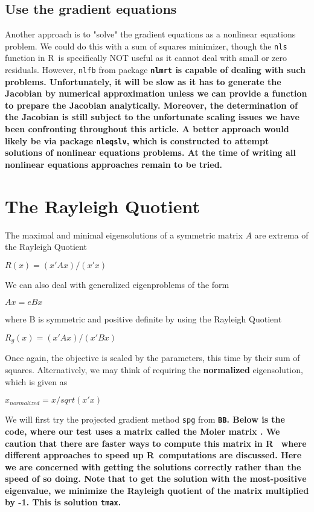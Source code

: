 \documentclass[11pt]{article}\usepackage[]{graphicx}\usepackage[]{color}
\newcommand{\B}[1]{{\bf #1 \rm}}
\newcommand{\R}{{\sf R}}
\newcommand{\code}[1]{{\tt#1}}
\newcommand{\pkg}[1]{\bf{\tt#1}\rm }
\begin{document}
\subsection{Use the gradient equations}

Another approach is to "solve" the gradient equations as a nonlinear equations
problem. We could do this with 
a sum of squares minimizer, though the \code{nls} function in \R\ is 
specifically NOT useful as it cannot deal
with small or zero residuals. However, \code{nlfb} 
from package \pkg{nlmrt} is capable of dealing
with such problems. Unfortunately, it will be slow as it has to 
generate the Jacobian by numerical
approximation unless we can provide a function to prepare the 
Jacobian analytically. Moreover,
the determination of the Jacobian is still subject to 
the unfortunate scaling issues we have
been confronting throughout this article. A better approach
would likely be via package \code{nleqslv}, which is constructed
to attempt solutions of nonlinear equations problems. At the time
of writing all nonlinear equations approaches remain to be tried.


\section{The Rayleigh Quotient}

The maximal and minimal eigensolutions of a symmetric matrix $A$ 
are extrema of the Rayleigh Quotient

$ R(x) =  (x' A x)  / (x' x) $

We can also deal with generalized eigenproblems of the form 

$A x = e B x$

where B is symmetric and positive definite by using the Rayleigh Quotient

$ R_g(x) =  (x' A x)  / (x' B x) $


Once again, the objective is scaled by the parameters, this time by their 
sum of squares. Alternatively, 
we may think of requiring the \B{normalized} eigensolution, which is given as 

$ x_{normalized} = x/sqrt(x' x) $

We will first try the projected gradient method \code{spg} from \pkg{BB}. 
Below is the code, where our test uses
a matrix called the Moler matrix \cite[Appendix 1]{cnm79}. We caution that there
are faster ways to compute this matrix in \R\ \citep{RQtimes12} where different
approaches to speed up \R\ computations are discussed. Here we are concerned 
with getting the solutions correctly rather than the speed of so doing. Note
that to get the solution with the most-positive eigenvalue, we minimize the
Rayleigh quotient of the matrix multiplied by -1. This is solution \code{tmax}.
\end{document}
